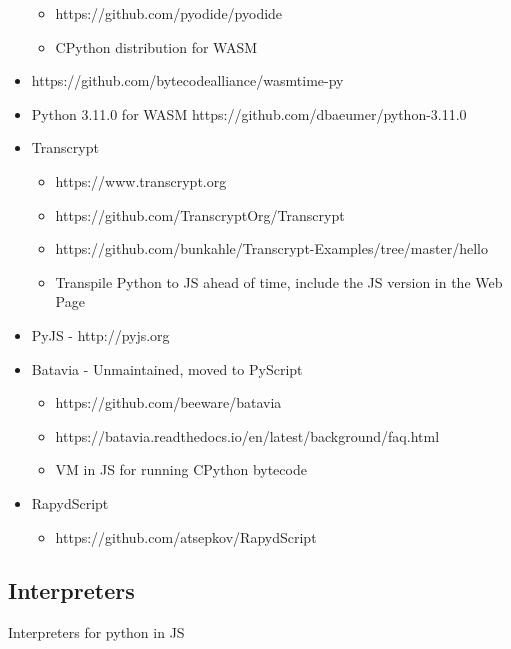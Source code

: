\begin{itemize}
  \begin{itemize}
  \tightlist
  \item
    https://github.com/pyodide/pyodide
  \item
    CPython distribution for WASM
  \end{itemize}
\item
  https://github.com/bytecodealliance/wasmtime-py
\item
  Python 3.11.0 for WASM https://github.com/dbaeumer/python-3.11.0
\item
  Transcrypt

  \begin{itemize}
  \tightlist
  \item
    https://www.transcrypt.org
  \item
    https://github.com/TranscryptOrg/Transcrypt
  \item
    https://github.com/bunkahle/Transcrypt-Examples/tree/master/hello
  \item
    Transpile Python to JS ahead of time, include the JS version in the Web Page
  \end{itemize}
\item
  PyJS - http://pyjs.org
\item
  Batavia - Unmaintained, moved to PyScript

  \begin{itemize}
  \tightlist
  \item
    https://github.com/beeware/batavia
  \item
    https://batavia.readthedocs.io/en/latest/background/faq.html
  \item
    VM in JS for running CPython bytecode
  \end{itemize}
\item
  RapydScript

  \begin{itemize}
  \tightlist
  \item
    https://github.com/atsepkov/RapydScript
  \end{itemize}
\end{itemize}

\subsection{Interpreters}\label{notes__03100-python.md__interpreters}

Interpreters for python in JS

